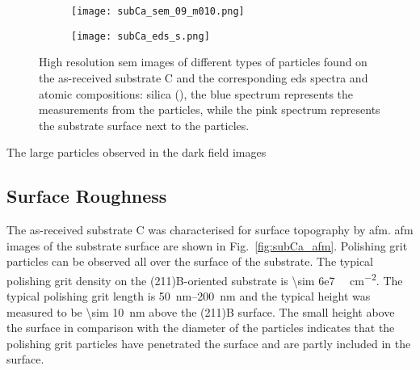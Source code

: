 \begin{figure}
    \centering
    \begin{subfigure}[t]{\textwidth}
        \caption{}\label{fig:subCa_polishing-grit}
          \begin{minipage}[t]{0.43\linewidth}
            \centering
            \texttt{[image: subCa\_sem\_09\_m010.png]}
          \end{minipage}
          \hfill
          \begin{minipage}[t]{0.43\linewidth}
            \centering
            \texttt{[image: subCa\_eds\_s.png]}
          \end{minipage}
          \begin{minipage}[t]{0.11\linewidth}
            \centering
            \atomicTable[&][&][&]
          \end{minipage}
    \end{subfigure}%
    \caption[\Ac{sem} images, \ac{eds} spectra, and \ac{eds} atomic compositions of  different types of particles found on as-received substrate C.]{High resolution \ac{sem} images of  different types of particles found on the as-received substrate C and the corresponding \ac{eds} spectra and atomic compositions:  silica (), the blue spectrum represents the measurements from the particles, while the pink spectrum represents the substrate surface next to the particles.}\label{fig:subCa_sem_w_eds}
\end{figure}

The large particles observed in the dark field images 

\subsection{Surface Roughness}
The as-received substrate C was characterised for surface topography by \ac{afm}. \Ac{afm} images of the substrate surface are shown in Fig.~\ref{fig:subCa_afm}. Polishing grit particles can be observed all over the surface of the substrate. The typical polishing grit density on the (211)B-oriented substrate is \SI{\sim 6e7 }{\particle\centi\metre^{-2}}. The typical polishing grit length is \SIrange{50}{200}{\nano\metre} and the typical height was measured to be \SI{\sim 10}{\nano\metre} above the (211)B surface. The small height above the surface in comparison with the diameter of the particles indicates that the polishing grit particles have penetrated the surface and are partly included in the surface.

